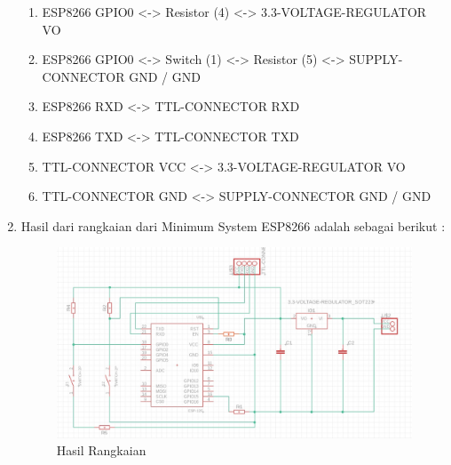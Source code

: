 \begin{enumerate}
\begin{enumerate}
            \item ESP8266 GPIO0 <-> Resistor (4) <-> 3.3-VOLTAGE-REGULATOR VO
            \item ESP8266 GPIO0 <-> Switch (1) <-> Resistor (5) <->  SUPPLY-CONNECTOR GND / GND
            \item ESP8266 RXD <-> TTL-CONNECTOR RXD
            \item ESP8266 TXD <-> TTL-CONNECTOR TXD
            \item TTL-CONNECTOR VCC <-> 3.3-VOLTAGE-REGULATOR VO
            \item TTL-CONNECTOR GND <->  SUPPLY-CONNECTOR GND / GND
        \end{enumerate}
    \item Hasil dari rangkaian dari Minimum System ESP8266 adalah sebagai berikut :
        \begin{figure}[H]
            \centering
            \includegraphics[width=0.6\linewidth]{P1/img/gambar23.jpeg}
            \caption{Hasil Rangkaian} 
            \label{fig:Hasil Rangkaian}
        \end{figure}
\end{enumerate}
        

